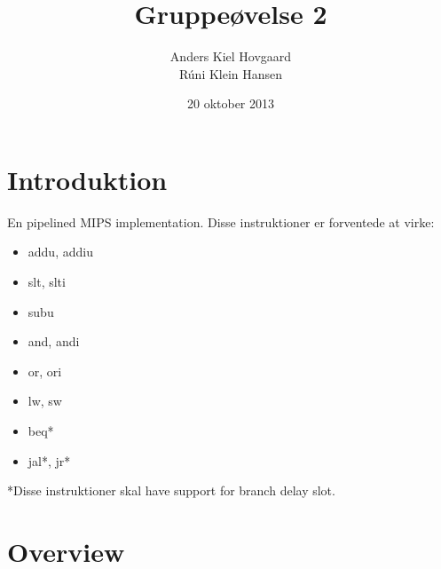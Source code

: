 \documentclass[12pt,a4paper,danish]{article}
\begin{document}
\title{Gruppeøvelse 2}
\author{Anders Kiel Hovgaard\\Rúni Klein Hansen}
\date{20 oktober 2013}
\maketitle

\section{Introduktion}
En pipelined MIPS implementation. Disse instruktioner er forventede at virke:
\begin{itemize}
  \item addu, addiu
  \item slt, slti
  \item subu
  \item and, andi
  \item or, ori
  \item lw, sw
  \item beq*
  \item jal*, jr*
\end{itemize}
*Disse instruktioner skal have support for branch delay slot.

\section{Overview}
\end{document}
